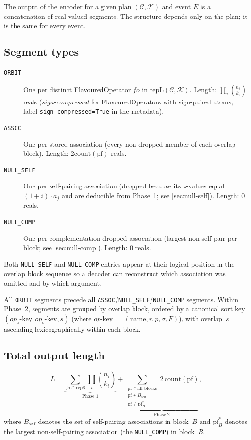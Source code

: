 \documentclass[11pt,a4paper]{article}
\theoremstyle{definition}
\theoremstyle{plain}
\theoremstyle{remark}
\newcommand{\repS}{\mathrm{repS}}
\newcommand{\repL}{\mathrm{repL}}
\newcommand{\pf}{\mathrm{pf}}
\newcommand{\acount}{\mathrm{count}}
\newcommand{\comb}[2]{\binom{#1}{#2}}
\begin{document}
The output of the encoder for a given plan $(\mathcal{C}, \mathcal{K})$ and
event $E$ is a concatenation of real-valued segments.  The structure depends
only on the plan; it is the same for every event.

\subsection{Segment types}

\begin{description}
  \item[\texttt{ORBIT}] One per distinct FlavouredOperator $\mathit{fo}$ in
    $\repL(\mathcal{C},\mathcal{K})$.  Length: $\prod_i \comb{n_i}{k_i}$ reals
    (\emph{sign-compressed} for FlavouredOperators with sign-paired atoms; label
    \texttt{sign\_compressed=True} in the metadata).

  \item[\texttt{ASSOC}] One per stored association (every non-dropped member of
    each overlap block).  Length: $2\acount(\pf)$ reals.

  \item[\texttt{NULL\_SELF}] One per self-pairing association (dropped because
    its $z$-values equal $(1+i)\cdot a_j$ and are deducible from Phase~1;
    see \cref{sec:null-self}).  Length: 0 reals.

  \item[\texttt{NULL\_COMP}] One per complementation-dropped association
    (largest non-self-pair per block; see \cref{sec:null-comp}).
    Length: 0 reals.
\end{description}

Both \texttt{NULL\_SELF} and \texttt{NULL\_COMP} entries appear at their logical
position in the overlap block sequence so a decoder can reconstruct which
association was omitted and by which argument.

All \texttt{ORBIT} segments precede all \texttt{ASSOC}/\texttt{NULL\_SELF}/\texttt{NULL\_COMP} segments.
Within Phase~2, segments are grouped by overlap block, ordered by a canonical
sort key $(\mathit{op}_u\text{-key}, \mathit{op}_v\text{-key}, s)$ (where
$\mathit{op}$-key $= (\mathrm{name}, r, p, \sigma, F)$), with overlap~$s$
ascending lexicographically within each block.

\subsection{Total output length}

\begin{equation}
  L = \underbrace{\sum_{\mathit{fo} \in \repS} \prod_i \comb{n_i}{k_i}}_{\text{Phase~1}}
    + \underbrace{\sum_{\substack{\pf \in \text{all blocks} \\ \pf \notin B_\mathrm{self} \\ \pf \ne \pf^*_B}}\!
      2\,\acount(\pf)}_{\text{Phase~2}},
\end{equation}
where $B_\mathrm{self}$ denotes the set of self-pairing associations in block~$B$
and $\pf^*_B$ denotes the largest non-self-pairing association (the
\texttt{NULL\_COMP}) in block~$B$.
\end{document}
